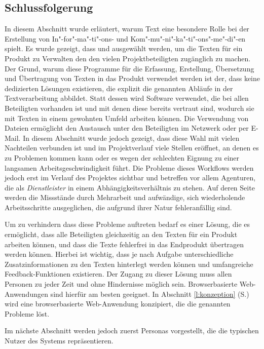 \subsection{Schlussfolgerung}\label{l:schlussfolgerung}

In diesem Abschnitt wurde erläutert, warum Text eine besondere Rolle bei der Erstellung von In"-for"-ma"-ti"-ons- und Kom"-mu"-ni"-ka"-ti"-ons"-me"-di"-en spielt. Es wurde gezeigt, dass  und  ausgewählt werden, um die Texten für ein Produkt zu Verwalten den den vielen Projektbeteiligten zugänglich zu machen. Der Grund, warum diese Programme für die Erfassung, Erstellung, Übersetzung und Übertragung von Texten in das Produkt verwendet werden ist der, dass keine  dedizierten Lösungen existieren, die explizit die genannten Abläufe in der Textverarbeitung abbildet. Statt dessen wird Software verwendet, die bei allen Beteiligten vorhanden ist und mit denen diese bereits vertraut sind, wodurch sie mit Texten in einem gewohnten Umfeld arbeiten können. Die Verwendung von Dateien ermöglicht den Austausch unter den Beteiligten im Netzwerk oder per E-Mail. In diesem Abschnitt wurde jedoch gezeigt, dass diese Wahl mit vielen Nachteilen verbunden ist und im Projektverlauf viele Stellen eröffnet, an denen es zu Problemen kommen kann oder es wegen der schlechten Eignung zu einer langsamen Arbeitsgeschwindigkeit führt. Die Probleme dieses Workflows werden jedoch erst im Verlauf des Projektes sichtbar und betreffen vor allem Agenturen, die als \emph{Dienstleister} in einem Abhängigkeitsverhältnis zu stehen. Auf deren Seite werden die Missstände durch Mehrarbeit und aufwändige, sich wiederholende Arbeitsschritte ausgeglichen, die aufgrund ihrer Natur fehleranfällig sind.

Um zu verhindern dass diese Probleme auftreten bedarf es einer Lösung, die es ermöglicht, dass alle Beteiligten gleichzeitig an den Texten für ein Produkt arbeiten können, und dass die Texte fehlerfrei in das Endprodukt übertragen werden können. Hierbei ist wichtig, dass je nach Aufgabe unterschiedliche Zusatzinformationen zu den Texten hinterlegt werden können und umfangreiche Feedback-Funktionen existieren. Der Zugang zu dieser Lösung muss allen Personen zu jeder Zeit und ohne Hindernisse möglich sein. Browserbasierte Web-Anwendungen sind hierfür am besten geeignet. In Abschnitt \ref{l:konzeption} (S.\pageref{l:konzeption}) wird eine browserbasierte Web-Anwendung konzipiert, die die genannten Probleme löst. 

\bigskip

Im nächste Abschnitt werden jedoch zuerst Personas vorgestellt, die die typischen Nutzer des Systems repräsentieren.

\pagebreak